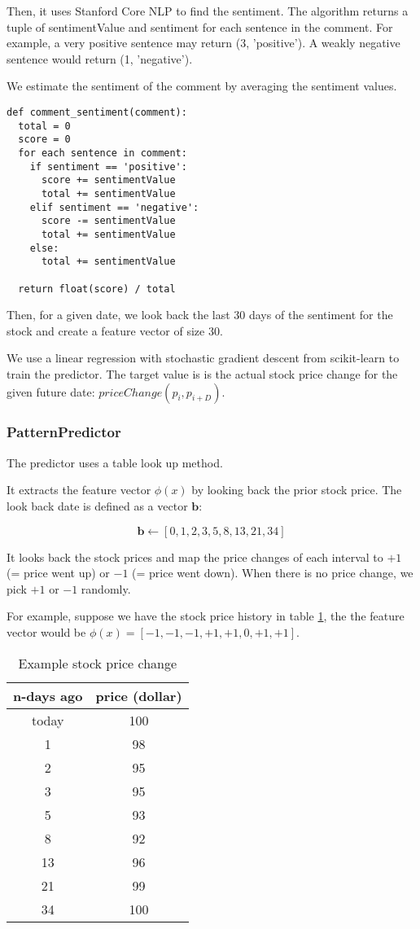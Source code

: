 \documentclass[twocolumn,10pt]{asme2ej}
\newcommand{\vect}[1]{\boldsymbol{#1}}
\begin{document}
Then, it uses Stanford Core NLP \cite{manning-EtAl:2014:P14-5} to find
the sentiment. The algorithm returns a tuple of sentimentValue and
sentiment for each sentence in the comment. For example, a very
positive sentence may return (3, 'positive'). A weakly negative
sentence would return (1, 'negative').

We estimate the sentiment of the comment by averaging the sentiment
values.

\begin{verbatim}
def comment_sentiment(comment):
  total = 0
  score = 0
  for each sentence in comment:
    if sentiment == 'positive':
      score += sentimentValue
      total += sentimentValue
    elif sentiment == 'negative':
      score -= sentimentValue
      total += sentimentValue
    else:
      total += sentimentValue

  return float(score) / total
\end{verbatim}

Then, for a given date, we look back the last 30 days of the sentiment
for the stock and create a feature vector of size 30.

We use a linear regression with stochastic gradient descent from
scikit-learn \cite{web:scikit_learn} to train the predictor. The
target value is is the actual stock price change for the given future
date: $priceChange(p_i, p_{i+D})$.

\subsubsection{PatternPredictor}

The predictor uses a table look up method.

It extracts the feature vector $\phi(x)$ by looking back the prior
stock price. The look back date is defined as a vector $\vect{b}$:

\[
\vect{b} \gets [0, 1, 2, 3, 5, 8, 13, 21, 34]
\]

It looks back the stock prices and map the price changes of each
interval to $+1$ (= price went up) or $-1$ (= price went down). When
there is no price change, we pick $+1$ or $-1$ randomly.

For example, suppose we have the stock price history in table
\ref{patternStockExample}, the the feature vector would be
$\phi(x)=[-1,-1,-1,+1,+1,0,+1,+1]$.

\begin{table}
  \begin{tabular}{cc}
    n-days ago & price (dollar) \\
    \hline
    today & 100 \\
    1 & 98 \\
    2 & 95 \\
    3 & 95 \\
    5 & 93 \\
    8 & 92 \\
    13 & 96 \\
    21 & 99 \\
    34 & 100 \\
  \end{tabular}
  \caption{Example stock price change}
  \label{patternStockExample}
\end{table}
\end{document}
